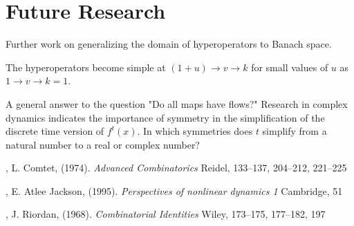 \documentclass{article}
\theoremstyle{definition}
\begin{document}
\section{Future Research}
Further work on generalizing the domain of hyperoperators to Banach space. 

The hyperoperators become simple at $(1+u) \rightarrow v \rightarrow k$ for small values of $u$ as 
$1 \rightarrow v \rightarrow k = 1$.

A general answer to the question "Do all maps have flows?" Research in complex dynamics indicates the importance of symmetry in the simplification of the discrete time version of $f^t(x)$. In which symmetries does $t$ simplify from a natural number to a real or complex number?

\begin{thebibliography}{2}

, 
L. Comtet, (1974). \textit{Advanced Combinatorics\/} Reidel, 133--137, 204--212, 221--225

,
E. Atlee Jackson, (1995). \textit{Perspectives of nonlinear dynamics 1\/} Cambridge, 51

, 
  J. Riordan, (1968). \textit{Combinatorial Identities\/} Wiley, 173--175, 177--182, 197

\end{thebibliography}
\end{document}
